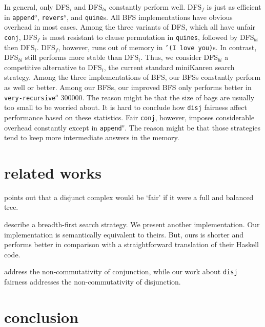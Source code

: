 \documentclass[format=acmlarge, review=true, authordraft=true]{acmart}
\newcommand{\conj}{\texttt{conj}}
\newcommand{\disj}{\texttt{disj}}
\newcommand{\veryrecursiveo}{\texttt{very-recursive$^o$}}
\newcommand{\appendo}{\texttt{append$^o$}}
\newcommand{\reverso}{\texttt{revers$^o$}}
\newcommand{\DFSi }[0]{DFS$_{i}$}
\newcommand{\DFSf }[0]{DFS$_{f}$}
\newcommand{\DFSbi}[0]{DFS$_{bi}$}
\newcommand{\BFS}[0]{BFS}
\newcommand{\BFSimp}[0]{our improved BFS}
\begin{document}


In general, only \DFSi{} and \DFSbi{} constantly perform well. \DFSf{}
is just as efficient in \appendo, \reverso, and \texttt{quine}s. All BFS
implementations have obvious overhead in most cases. 
Among the three variants of DFS, which all have unfair \conj{}, \DFSf{} is most 
resistant to clause permutation in \texttt{quines}, followed by \DFSbi{} then 
\DFSi{}. \DFSf{}, however, runs out of memory in \texttt{'(I love you)}s. In 
contrast, \DFSbi{} still performs more stable than \DFSi{}. Thus, we consider 
\DFSbi{} a competitive alternative to \DFSi{}, the current standard miniKanren 
search strategy. 
Among the three implementations of \BFS, our \BFS{}s constantly perform as well 
or better. Among our \BFS{}s, \BFSimp{} only performs better in 
\veryrecursiveo{} 300000. The reason might be that the size of bags are usually 
too small to be worried about. 
It is hard to conclude how \disj{} fairness affect performance based on these 
statistics. 
Fair \conj{}, however, imposes considerable overhead constantly except in 
\appendo. The reason might be that those strategies tend to keep more 
intermediate answers in the memory.

\section{related works}

\citet{yang2010adventures} points out that a disjunct complex would be `fair' 
if it were a full and balanced tree.

\citet{seres1999algebra} describe a breadth-first search 
strategy. We present another implementation. Our implementation is semantically 
equivalent to theirs. But, ours is shorter and performs better in comparison 
with a straightforward translation of their Haskell code.

\citet{rozplokhas2018improving} address the non-commutativity of conjunction, 
while our work about \disj{} fairness addresses the non-commutativity of 
disjunction.

\section{conclusion}
\end{document}
